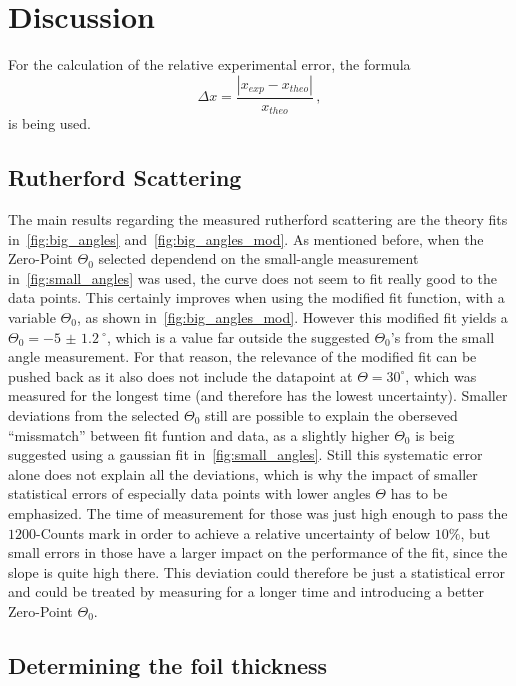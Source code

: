 \section{Discussion}
\label{sec:Discussion}

For the calculation of the relative experimental error, the formula
\begin{equation}
    \Delta x =   \frac{ \left| x_{exp} - x_{theo} \right|   }{x_{theo}} \, ,
    \label{eq:abweichung}
\end{equation}
is being used.

\subsection{Rutherford Scattering}

The main results regarding the measured rutherford scattering are the theory fits in~\autoref{fig:big_angles} and~\autoref{fig:big_angles_mod}.
As mentioned before, when the Zero-Point $\Theta_0$ selected dependend on the small-angle measurement in~\autoref{fig:small_angles} was used, the curve does not seem to fit really good to the data points. 
This certainly improves when using the modified fit function, with a variable $\Theta_0$, as shown in~\autoref{fig:big_angles_mod}. 
However this modified fit yields a $\Theta_0 = \qty{-5(1.2)}{^{\circ}}$, which is a value far outside the suggested $\Theta_0$'s from the small angle measurement. 
For that reason, the relevance of the modified fit can be pushed back as it also does not include the datapoint at $\Theta = 30^{\circ}$, which was measured for the longest time (and therefore has the lowest uncertainty).
Smaller deviations from the selected $\Theta_0$ still are possible to explain the oberseved ``missmatch'' between fit funtion and data, as a slightly higher $\Theta_0$ is beig suggested using a gaussian fit in~\autoref{fig:small_angles}.
Still this systematic error alone does not explain all the deviations, which is why the impact of smaller statistical errors of especially data points with lower angles $\Theta$ has to be emphasized. 
The time of measurement for those was just high enough to pass the $1200$-Counts mark in order to achieve a relative uncertainty of below $10 \%$, but small errors in those have a larger impact on the performance of the fit, since the slope is quite high there.
This deviation could therefore be just a statistical error and could be treated by measuring for a longer time and introducing a better Zero-Point $\Theta_0$.

\subsection{Determining the foil thickness}

